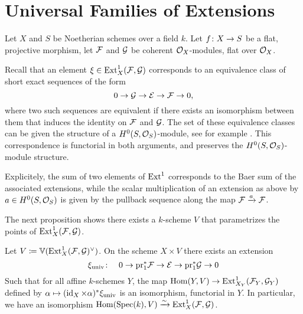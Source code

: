 \section{Universal Families of Extensions}

Let $X$ and $S$ be Noetherian schemes over a field $k$. Let $f \colon X \to S$ be a flat, projective morphism, let $\mathcal{F}$ and $\mathcal{G}$ be coherent $\mathcal{O}_X$-modules, flat over $\mathcal{O}_X$.

Recall that an element $\xi \in \operatorname{Ext}^1_{X}(\mathcal{F},\mathcal{G})$ corresponds to an equivalence class of short exact sequences of the form
\[
	0 \to \mathcal{G} \to \mathcal{E} \to \mathcal{F} \to 0,
\]
where two such sequences are equivalent if there exists an isomorphism between them that induces the identity on $\mathcal{F}$ and $\mathcal{G}$. The set of these equivalence classes can be given the structure of a $H^0(S,\mathcal{O}_S)$-module, see for example \cite[{}3.4]{weibel-homological-algebra}. This correspondence is functorial in both arguments, and preserves the $H^0(S, \mathcal{O}_S)$-module structure.

Explicitely, the sum of two elements of $\operatorname{Ext}^1$ corresponds to the Baer sum of the associated extensions, while the scalar multiplication of an extension
as above by $a\in H^0(S,\mathcal{O}_S)$ is given by the pullback sequence along the map $\mathcal{F}\xrightarrow{a}\mathcal{F}$.

The next proposition shows there exists a $k$-scheme $V$ that parametrizes the points of $\operatorname{Ext}^{1}_X(\mathcal{F},\mathcal{G})$.

\begin{proposition} \label{cor:universal-extension}
Let $V \coloneqq \mathbb{V}(\operatorname{Ext}^1_X(\mathcal{F},\mathcal{G})^\vee)$. On the scheme $X\times V$ there exists an extension
	\[
		\xi_{\mathrm{univ}} \colon \quad 0 \to \mathrm{pr}_1^{*}\mathcal{F} \to \mathcal{E} \to \mathrm{pr}_1^{*}\mathcal{G} \to 0
	\]
Such that for all affine $k$-schemes $Y$, the map
$\operatorname{Hom}(Y,V)\to\operatorname{Ext}^1_{X_Y}(\mathcal{F}_Y,\mathcal{G}_Y)$ defined by
$\alpha \mapsto (\operatorname{id}_X\times \alpha)^{*} \xi_{\mathrm{univ}}$
is an isomorphism, functorial in $Y$.
In particular, we have an isomorphism $\operatorname{Hom}(\operatorname{Spec}(k),V)\xrightarrow{\sim} \operatorname{Ext}^1_{X}(\mathcal{F},\mathcal{G})$.
\end{proposition}

